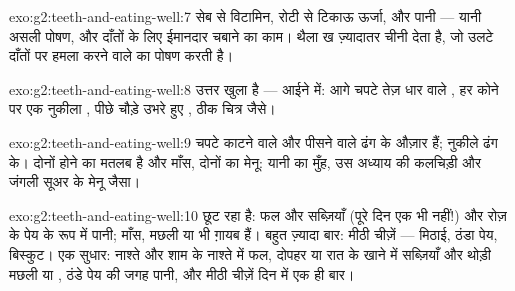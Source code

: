 \begin{solution}{exo:g2:teeth-and-eating-well:7}
सेब से विटामिन, रोटी से टिकाऊ ऊर्जा, और पानी --- यानी असली पोषण, और
दाँतों के लिए ईमानदार चबाने का काम। थैला ख ज़्यादातर चीनी देता है, जो
उलटे दाँतों पर हमला करने वाले  का पोषण करती है।
\end{solution}

\begin{solution}{exo:g2:teeth-and-eating-well:8}
उत्तर खुला है --- आईने में: आगे चपटे तेज़ धार वाले , हर कोने पर
एक नुकीला , पीछे चौड़े उभरे हुए , ठीक चित्र जैसे।
\end{solution}

\begin{solution}{exo:g2:teeth-and-eating-well:9}
चपटे काटने वाले  और पीसने वाले   ढंग के औज़ार हैं;
नुकीले   ढंग के। दोनों होने का मतलब है  और माँस,
दोनों का मेनू: यानी  का मुँह, उस अध्याय की कलचिड़ी और जंगली
सूअर के मेनू जैसा।
\end{solution}

\begin{solution}{exo:g2:teeth-and-eating-well:10}
छूट रहा है: फल और सब्ज़ियाँ (पूरे दिन एक भी नहीं!) और रोज़ के पेय के
रूप में पानी; माँस, मछली या  भी ग़ायब हैं। बहुत ज़्यादा बार: मीठी
चीज़ें --- मिठाई, ठंडा पेय, बिस्कुट। एक सुधार: नाश्ते और शाम के नाश्ते
में फल, दोपहर या रात के खाने में सब्ज़ियाँ और थोड़ी मछली या , ठंडे
पेय की जगह पानी, और मीठी चीज़ें दिन में एक ही बार।
\end{solution}
